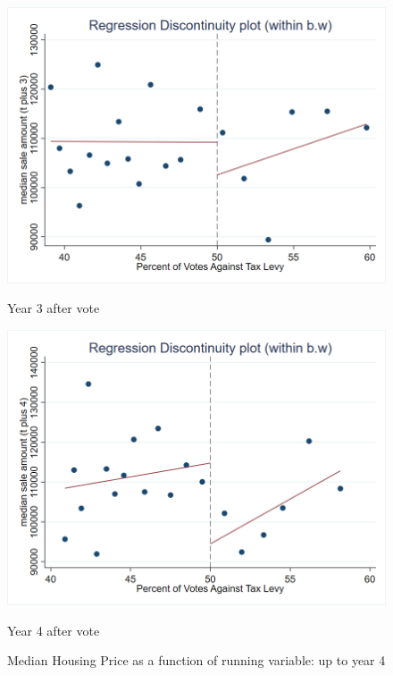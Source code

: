 \begin{figure}[ht]
    \vspace{1em}
    
    \begin{minipage}[b]{0.48\textwidth}
        \centering
        \includegraphics[width=\textwidth,keepaspectratio]{images/rd_plot_median_sale_amount_t_plus_3_tri_mserd_1_2_within.png}
        \caption*{Year 3 after vote}
        \label{fig:hp_year3_after}
    \end{minipage}
    \hfill
    \begin{minipage}[b]{0.48\textwidth}
        \centering
        \includegraphics[width=\textwidth,keepaspectratio]{images/rd_plot_median_sale_amount_t_plus_4_tri_mserd_1_2_within.png}
        \caption*{Year 4 after vote}
        \label{fig:hp_year4_after}
    \end{minipage}
    
    \caption{Median Housing Price as a function of running variable: up to year 4}
    \label{fig:rd_hp_1}
\end{figure}

